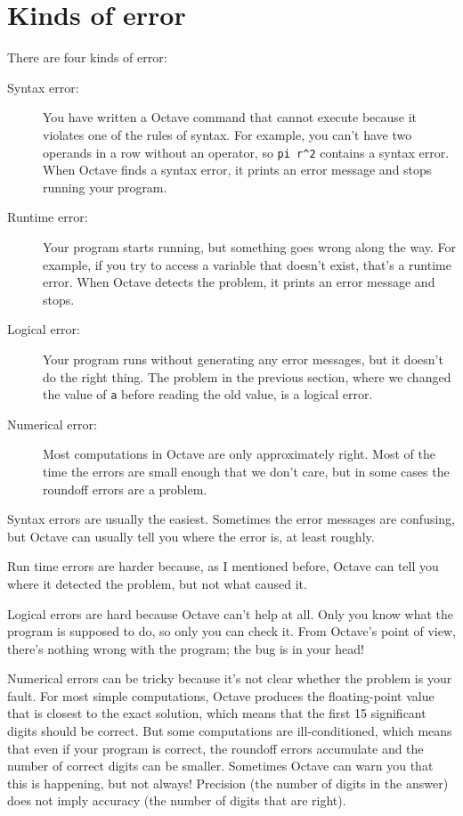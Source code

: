 \section{Kinds of error}

There are four kinds of error:

\begin{description}

\item[Syntax error:] You have written a Octave command that cannot
execute because it violates one of the rules of syntax. For example,
you can't have two operands in a row without an operator, so 
\verb+pi r^2+ contains a syntax error. When Octave finds a syntax
error, it prints an error message and stops running your program.

\item[Runtime error:] Your program starts running, but something goes
wrong along the way. For example, if you try to access a variable
that doesn't exist, that's a runtime error. When Octave detects the
problem, it prints an error message and stops.

\item[Logical error:] Your program runs without generating any error
messages, but it doesn't do the right thing. The problem in the
previous section, where we changed the value of {\tt a} before
reading the old value, is a logical error.

\item[Numerical error:] Most computations in Octave are only
approximately right. Most of the time the errors are small enough
that we don't care, but in some cases the roundoff errors are a problem.

\end{description}

Syntax errors are usually the easiest. Sometimes the error messages
are confusing, but Octave can usually tell you where the error is, at
least roughly.

Run time errors are harder because, as I mentioned before, Octave
can tell you where it detected the problem, but not what caused it.

Logical errors are hard because Octave can't help at all. Only you
know what the program is supposed to do, so only you can check it.
From Octave's point of view, there's nothing wrong with the program;
the bug is in your head!

Numerical errors can be tricky because it's not clear whether the
problem is your fault. For most simple computations, Octave produces
the floating-point value that is closest to the exact solution, which
means that the first 15 significant digits should be correct. But some
computations are ill-conditioned, which means that even if your program
is correct, the roundoff errors accumulate and the number of correct
digits can be smaller. Sometimes Octave can warn you that
this is happening, but not always! Precision (the number of digits
in the answer) does not imply accuracy (the number of digits that
are right).


